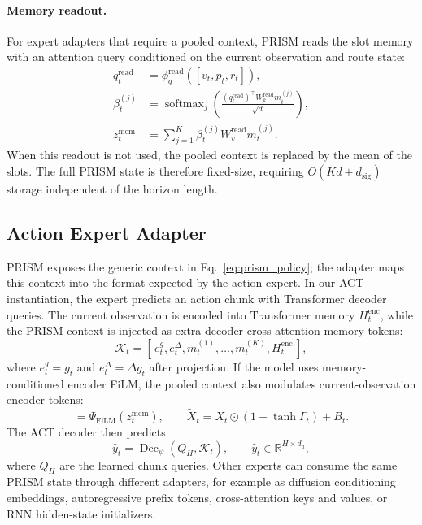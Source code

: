 \paragraph{Memory readout.}
For expert adapters that require a pooled context, PRISM reads the slot memory
with an attention query conditioned on the current observation and route state:
\begin{align}
    q_t^{\mathrm{read}}
    &=
    \phi_q^{\mathrm{read}}([v_t,p_t,r_t]),
    \\
    \beta_t^{(j)}
    &=
    \operatorname{softmax}_j
    \left(
    \frac{(q_t^{\mathrm{read}})^\top W_k^{\mathrm{read}}m_t^{(j)}}{\sqrt{d}}
    \right),
    \\
    z_t^{\mathrm{mem}}
    &=
    \sum_{j=1}^{K}
    \beta_t^{(j)} W_v^{\mathrm{read}}m_t^{(j)}.
    \label{eq:memory_readout}
\end{align}
When this readout is not used, the pooled context is replaced by the mean of the
slots. The full PRISM state is therefore fixed-size, requiring
$O(Kd+d_{\mathrm{sig}})$ storage independent of the horizon length.

\subsection{Action Expert Adapter}
\label{sec:method_adapter}

PRISM exposes the generic context in Eq.~\eqref{eq:prism_policy}; the adapter
maps this context into the format expected by the action expert. In our ACT
instantiation, the expert predicts an action chunk with Transformer decoder
queries. The current observation is encoded into Transformer memory
$H_t^{\mathrm{enc}}$, while the PRISM context is injected as extra decoder
cross-attention memory tokens:
\begin{equation}
    \mathcal{K}_t =
    [\, e_t^{g}, e_t^{\Delta}, m_t^{(1)},\ldots,m_t^{(K)}, H_t^{\mathrm{enc}} \,],
    \label{eq:act_memory_tokens}
\end{equation}
where $e_t^{g}=g_t$ and $e_t^{\Delta}=\Delta g_t$ after projection. If the model
uses memory-conditioned encoder FiLM, the pooled context also modulates
current-observation encoder tokens:
\begin{equation}
    [\Gamma_t,B_t] = \Psi_{\mathrm{FiLM}}(z_t^{\mathrm{mem}}),
    \qquad
    \tilde X_t =
    X_t \odot (1+\tanh \Gamma_t) + B_t.
    \label{eq:film}
\end{equation}
The ACT decoder then predicts
\begin{equation}
    \hat y_t =
    \operatorname{Dec}_{\psi}(Q_H,\mathcal{K}_t),
    \qquad
    \hat y_t \in \mathbb{R}^{H \times d_a},
\end{equation}
where $Q_H$ are the learned chunk queries. Other experts can consume the same
PRISM state through different adapters, for example as diffusion conditioning
embeddings, autoregressive prefix tokens, cross-attention keys and values, or
RNN hidden-state initializers.

